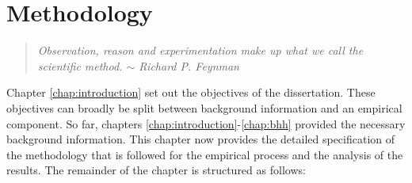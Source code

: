 \chapter{Methodology}
\label{chap:methodology}

\begin{quote}
      \textit{Observation, reason and experimentation make up what we call the scientific method. $\sim$ Richard P. Feynman}
\end{quote}


Chapter \ref{chap:introduction} set out the objectives of the dissertation. These objectives can broadly be split between background information and an empirical component. So far, chapters \ref{chap:introduction}-\ref{chap:bhh} provided the necessary background information. This chapter now provides the detailed specification of the methodology that is followed for the empirical process and the analysis of the results. The remainder of the chapter is structured as follows:

